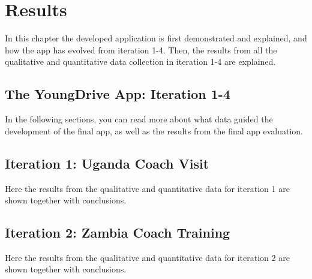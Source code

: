 \chapter{Results}\label{cha:Research}
%


In this chapter the developed application is first demonstrated and explained, and how the app has evolved from iteration 1-4. Then, the results from all the qualitative and quantitative data collection in iteration 1-4 are explained.


%

\section{The YoungDrive App: Iteration 1-4}\label{developed-application}

  

In the following sections, you can read more about what data guided the development of the final app, as well as the results from the final app evaluation.

\section{Iteration 1: Uganda Coach Visit}

Here the results from the qualitative and quantitative data for iteration 1 are shown together with conclusions.





\section{Iteration 2: Zambia Coach Training}

Here the results from the qualitative and quantitative data for iteration 2 are shown together with conclusions.






